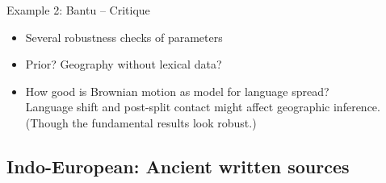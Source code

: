 \documentclass[9pt]{beamer}
\begin{document}
\begin{frame}{Example 2: Bantu – Critique}
  \begin{itemize}
  \item Several robustness checks of parameters
  \item Prior? Geography without lexical data?
  \item How good is Brownian motion as model for language spread?\\
    Language shift and post-split contact might affect geographic
    inference. (Though the fundamental results look robust.)
  \end{itemize}
\end{frame}
\subsection{Indo-European: Ancient written sources}
\end{document}
